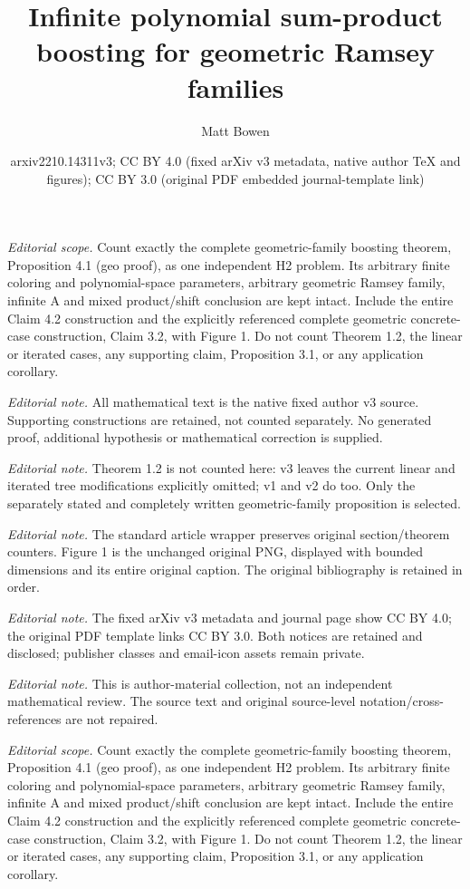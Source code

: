 \documentclass[10pt,a4paper]{article}
\title{Infinite polynomial sum-product boosting for geometric Ramsey families}
\author{Matt Bowen}
\date{arxiv2210.14311v3; CC BY 4.0 (fixed arXiv v3 metadata, native author TeX and figures); CC BY 3.0 (original PDF embedded journal-template link)}
\theoremstyle{definition}
\begin{document}
\maketitle
\setcounter{section}{1}
\setcounter{theorem}{0}
\noindent\textit{Editorial scope.} Count exactly the complete geometric-family boosting theorem, Proposition 4.1 (geo proof), as one independent H2 problem. Its arbitrary finite coloring and polynomial-space parameters, arbitrary geometric Ramsey family, infinite A and mixed product/shift conclusion are kept intact. Include the entire Claim 4.2 construction and the explicitly referenced complete geometric concrete-case construction, Claim 3.2, with Figure 1. Do not count Theorem 1.2, the linear or iterated cases, any supporting claim, Proposition 3.1, or any application corollary.\par\medskip
\noindent\textit{Editorial note.} All mathematical text is the native fixed author v3 source. Supporting constructions are retained, not counted separately. No generated proof, additional hypothesis or mathematical correction is supplied.\par\medskip
\noindent\textit{Editorial note.} Theorem 1.2 is not counted here: v3 leaves the current linear and iterated tree modifications explicitly omitted; v1 and v2 do too. Only the separately stated and completely written geometric-family proposition is selected.\par\medskip
\noindent\textit{Editorial note.} The standard article wrapper preserves original section/theorem counters. Figure 1 is the unchanged original PNG, displayed with bounded dimensions and its entire original caption. The original bibliography is retained in order.\par\medskip
\noindent\textit{Editorial note.} The fixed arXiv v3 metadata and journal page show CC BY 4.0; the original PDF template links CC BY 3.0. Both notices are retained and disclosed; publisher classes and email-icon assets remain private.\par\medskip
\noindent\textit{Editorial note.} This is author-material collection, not an independent mathematical review. The source text and original source-level notation/cross-references are not repaired.\par\medskip
\noindent\textit{Editorial scope.} Count exactly the complete geometric-family boosting theorem, Proposition 4.1 (geo proof), as one independent H2 problem. Its arbitrary finite coloring and polynomial-space parameters, arbitrary geometric Ramsey family, infinite A and mixed product/shift conclusion are kept intact. Include the entire Claim 4.2 construction and the explicitly referenced complete geometric concrete-case construction, Claim 3.2, with Figure 1. Do not count Theorem 1.2, the linear or iterated cases, any supporting claim, Proposition 3.1, or any application corollary.\par\medskip
\end{document}
